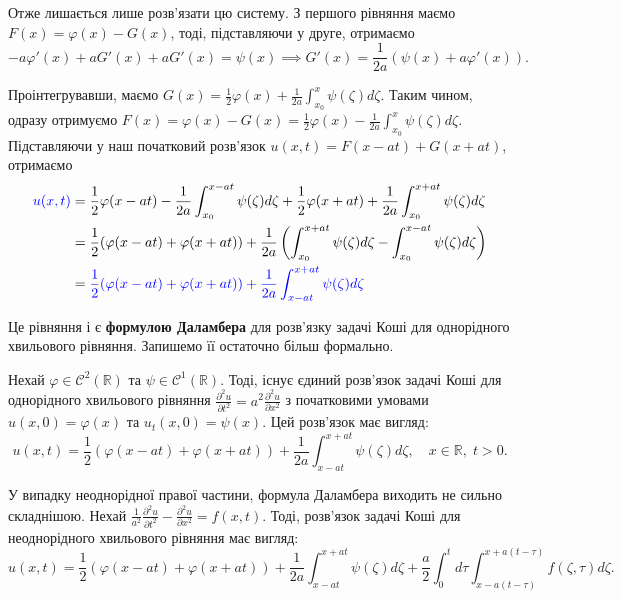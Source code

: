 \documentclass{exam_template}
\begin{document}
Отже лишається лише розв'язати цю систему. З першого рівняння маємо 
$F(x) = \varphi(x) - G(x)$, тоді, підставляючи у друге, отримаємо
\begin{equation*}
    -a\varphi'(x) + aG'(x) + aG'(x) = \psi(x) \implies G'(x) = \frac{1}{2a}\left(\psi(x) + a\varphi'(x)\right).
\end{equation*}

Проінтегрувавши, маємо $G(x) = \frac{1}{2}\varphi(x) + \frac{1}{2a}\int_{x_0}^x
\psi(\zeta)d\zeta$. Таким чином, одразу отримуємо $F(x) = \varphi(x) - G(x) =
\frac{1}{2}\varphi(x) - \frac{1}{2a}\int_{x_0}^x \psi(\zeta)d\zeta$. Підставляючи 
у наш початковий розв'язок $u(x,t) = F(x-at) + G(x+at)$, отримаємо
\begin{align*}
    \textcolor{blue}{u(x,t)} &= \frac{1}{2}\varphi(x-at) - \frac{1}{2a}\int_{x_0}^{x-at} \psi(\zeta)d\zeta + \frac{1}{2}\varphi(x+at) + \frac{1}{2a}\int_{x_0}^{x+at}
\psi(\zeta)d\zeta \\
    &= \frac{1}{2}(\varphi(x-at) + \varphi(x+at)) + \frac{1}{2a}\left(\int_{x_0}^{x+at} \psi(\zeta)d\zeta - \int_{x_0}^{x-at} \psi(\zeta)d\zeta\right) \\
    &= \textcolor{blue}{\frac{1}{2}(\varphi(x-at) + \varphi(x+at)) + \frac{1}{2a}\int_{x-at}^{x+at} \psi(\zeta)d\zeta}
\end{align*}

Це рівняння і є \textbf{формулою Даламбера} для розв'язку задачі Коші для
однорідного хвильового рівняння. Запишемо її остаточно більш формально.
\begin{theorem}
    Нехай $\varphi \in \mathcal{C}^2(\mathbb{R})$ та $\psi \in
    \mathcal{C}^1(\mathbb{R})$. Тоді, існує єдиний розв'язок задачі Коші для
    однорідного хвильового рівняння $\frac{\partial^2 u}{\partial t^2} = a^2
    \frac{\partial^2 u}{\partial x^2}$ з початковими умовами $u(x,0) =
    \varphi(x)$ та $u_t(x,0) = \psi(x)$. Цей розв'язок має вигляд:
    \begin{equation*}
        u(x,t) = \frac{1}{2}(\varphi(x-at) + \varphi(x+at)) + \frac{1}{2a}\int_{x-at}^{x+at} \psi(\zeta)d\zeta, \quad x \in \mathbb{R}, \; t > 0.
    \end{equation*}    
\end{theorem}

\begin{remark}
    У випадку неоднорідної правої частини, формула Даламбера виходить 
    не сильно складнішою. Нехай $\frac{1}{a^2}\frac{\partial^2 u}{\partial t^2}
    - \frac{\partial^2 u}{\partial x^2} = f(x,t)$. Тоді, розв'язок
    задачі Коші для неоднорідного хвильового рівняння має вигляд:
    \begin{equation*}
        u(x,t) = \frac{1}{2}(\varphi(x-at) + \varphi(x+at)) + \frac{1}{2a}\int_{x-at}^{x+at} \psi(\zeta)d\zeta + \frac{a}{2}\int_{0}^{t} d\tau \int_{x-a(t-\tau)}^{x+a(t-\tau)} f(\zeta,\tau)d\zeta.
    \end{equation*}
\end{remark}
\end{document}
